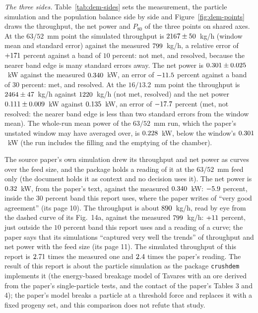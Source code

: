 \emph{The three sides.} Table~\ref{tab:dem-sides} sets the measurement, the particle simulation and the population balance side by side and Figure~\ref{fig:dem-points} draws the throughput, the net power and $P_{80}$ of the three points on shared axes. At the $63/52$~mm point the simulated throughput is $2167\pm50$~kg/h (window mean and standard error) against the measured $799$~kg/h, a relative error of $+171$ percent against a band of $10$ percent: not met, and resolved, because the nearer band edge is many standard errors away. The net power is $0.301\pm0.025$~kW against the measured $0.340$~kW, an error of $-11.5$ percent against a band of $30$ percent: met, and resolved. At the $16/13.2$~mm point the throughput is $2464\pm47$~kg/h against $1220$~kg/h (not met, resolved) and the net power $0.111\pm0.009$~kW against $0.135$~kW, an error of $-17.7$ percent (met, not resolved: the nearer band edge is less than two standard errors from the window mean). The whole-run mean power of the $63/52$~mm run, which the paper's unstated window may have averaged over, is $0.228$~kW, below the window's $0.301$~kW (the run includes the filling and the emptying of the chamber).

The source paper's own simulation drew its throughput and net power as curves over the feed size, and the package holds a reading of it at the $63/52$~mm feed only (the document holds it as context and no decision uses it). The net power is $0.32$~kW, from the paper's text, against the measured $0.340$~kW: $-5.9$ percent, inside the $30$ percent band this report uses, where the paper writes of ``very good agreement'' (its page 10). The throughput is about $890$~kg/h, read by eye from the dashed curve of its Fig.~14a, against the measured $799$~kg/h: $+11$ percent, just outside the $10$ percent band this report uses and a reading of a curve; the paper says that its simulations ``captured very well the trends'' of throughput and net power with the feed size (its page 11). The simulated throughput of this report is $2.71$ times the measured one and $2.4$ times the paper's reading. The result of this report is about the particle simulation as the package \texttt{crushdem} implements it (the energy-based breakage model of Tavares with an ore derived from the paper's single-particle tests, and the contact of the paper's Tables 3 and 4); the paper's model breaks a particle at a threshold force and replaces it with a fixed progeny set, and this comparison does not refute that study.

